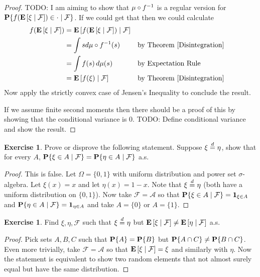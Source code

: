 \documentclass{amsart}
\theoremstyle{remark}
\theoremstyle{definition}
\newtheorem{ex}[thm]{Exercise}
\begin{document}
\begin{proof}
TODO: I am aiming to show that $\pushforward{f}{\mu}$ is a regular version
for
$\cprobability{\mathcal{F}}{f(\cexpectationlong{\mathcal{F}}{\xi}) \in
\cdot}$.
If we could get that then we could calculate
\begin{align*}
f(\cexpectationlong{\mathcal{F}}{\xi}) &=
\cexpectationlong{\mathcal{F}}
{f(\cexpectationlong{\mathcal{F}}{\xi})} \\
&= \int s d \pushforward{f}{\mu} (s) & & \text{by Theorem \ref{Disintegration}}\\
&= \int f(s) \, d\mu(s)  & & \text{by Expectation Rule} \\
&= \cexpectationlong{\mathcal{F}}{f(\xi)} & & \text{by Theorem \ref{Disintegration}}
\end{align*}
Now apply the strictly convex case of Jensen's Inequality to conclude
the result.

If we assume finite second moments then there should be a proof of
this by showing that the conditional variance is $0$.  TODO: Define
conditional variance and show the result.
\end{proof}

\begin{ex}Prove or disprove the following statement.  Suppose $\xi \eqdist \eta$, show that for every $A$, 
  $\cprobability{\mathcal{F}}{\xi \in A} =
  \cprobability{\mathcal{F}}{\eta \in A}$ a.s.
\end{ex}
\begin{proof}
This is false.  Let $\Omega = \lbrace 0,1 \rbrace$ with uniform distribution and
power set $\sigma$-algebra.  Let
$\xi(x) = x$ and let $\eta(x) = 1 - x$.  Note that $\xi \eqdist
\eta$ (both have a uniform distribution on $\lbrace 0,1 \rbrace$). Now take $\mathcal{F} = \mathcal{A}$ so that
$\cprobability{\mathcal{F}}{\xi \in A} = \characteristic{\xi \in A}$
and $\cprobability{\mathcal{F}}{\eta \in A} = \characteristic{\eta \in
  A}$ and take $A = \lbrace 0 \rbrace$ or $A = \lbrace 1 \rbrace$.
\end{proof}

\begin{ex}Find $\xi, \eta, \mathcal{F}$ such that $\xi \eqdist \eta$
  but $\cexpectationlong{\mathcal{F}}{\xi} \neq
  \cexpectationlong{\mathcal{F}}{\eta}$ a.s.
\end{ex}
\begin{proof}
Pick sets $A,B,C$ such that $\probability{A} = \probability{B}$ but
$\probability{A \cap C} \neq \probability{B \cap C}$.  Even more
trivially, take $\mathcal{F} = \mathcal{A}$ so that
$\cexpectationlong{\mathcal{F}}{\xi} = \xi$ and similarly with
$\eta$.  Now the statement is equivalent to show two random elements
that not almost surely equal but have the same distribution.
\end{proof}
\end{document}
